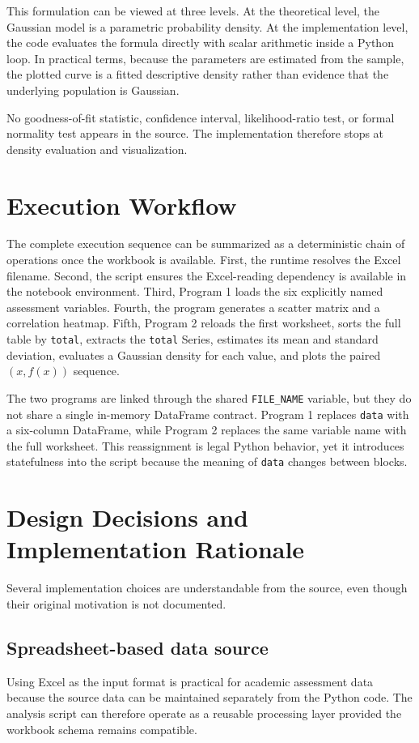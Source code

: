 \documentclass[11pt,a4paper]{article}
\begin{document}
This formulation can be viewed at three levels. At the theoretical level, the Gaussian model is a parametric probability density. At the implementation level, the code evaluates the formula directly with scalar arithmetic inside a Python loop. In practical terms, because the parameters are estimated from the sample, the plotted curve is a fitted descriptive density rather than evidence that the underlying population is Gaussian.

No goodness-of-fit statistic, confidence interval, likelihood-ratio test, or formal normality test appears in the source. The implementation therefore stops at density evaluation and visualization.

\section{Execution Workflow}
The complete execution sequence can be summarized as a deterministic chain of operations once the workbook is available. First, the runtime resolves the Excel filename. Second, the script ensures the Excel-reading dependency is available in the notebook environment. Third, Program 1 loads the six explicitly named assessment variables. Fourth, the program generates a scatter matrix and a correlation heatmap. Fifth, Program 2 reloads the first worksheet, sorts the full table by \texttt{total}, extracts the \texttt{total} Series, estimates its mean and standard deviation, evaluates a Gaussian density for each value, and plots the paired $(x,f(x))$ sequence.

The two programs are linked through the shared \texttt{FILE\_NAME} variable, but they do not share a single in-memory DataFrame contract. Program 1 replaces \texttt{data} with a six-column DataFrame, while Program 2 replaces the same variable name with the full worksheet. This reassignment is legal Python behavior, yet it introduces statefulness into the script because the meaning of \texttt{data} changes between blocks.

\section{Design Decisions and Implementation Rationale}
Several implementation choices are understandable from the source, even though their original motivation is not documented.

\subsection{Spreadsheet-based data source}
Using Excel as the input format is practical for academic assessment data because the source data can be maintained separately from the Python code. The analysis script can therefore operate as a reusable processing layer provided the workbook schema remains compatible.
\end{document}
